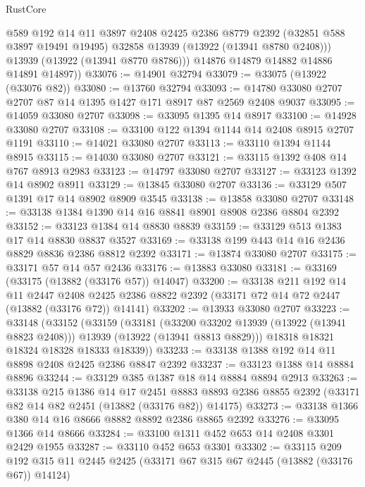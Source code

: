 \begin{lexlean}{RustCore}
\begin{coremodule}
            @589
            @192
            @14
            @11
            @3897
            @2408
            @2425
            @2386
            @8779
            @2392
            (@32851 @588 @3897 @19491 @19495)
            @32858
            @13939
            (@13922 (@13941 @8780 @2408)))
          @13939
          (@13922 (@13941 @8770 @8786)))
        @14876
        @14879
        @14882
        @14886
        @14891
        @14897))
@33076 := @14901 @32794
@33079 := @33075 (@13922 (@33076 @82))
@33080 := @13760 @32794
@33093 := @14780 @33080 @2707 @2707 @87 @14 @1395 @1427 @171 @8917 @87 @2569 @2408 @9037
@33095 := @14059 @33080 @2707
@33098 := @33095 @1395 @14 @8917
@33100 := @14928 @33080 @2707
@33108 := @33100 @122 @1394 @1144 @14 @2408 @8915 @2707 @1191
@33110 := @14021 @33080 @2707
@33113 := @33110 @1394 @1144 @8915
@33115 := @14030 @33080 @2707
@33121 := @33115 @1392 @408 @14 @767 @8913 @2983
@33123 := @14797 @33080 @2707
@33127 := @33123 @1392 @14 @8902 @8911
@33129 := @13845 @33080 @2707
@33136 := @33129 @507 @1391 @17 @14 @8902 @8909 @3545
@33138 := @13858 @33080 @2707
@33148 := @33138 @1384 @1390 @14 @16 @8841 @8901 @8908 @2386 @8804 @2392
@33152 := @33123 @1384 @14 @8830 @8839
@33159 := @33129 @513 @1383 @17 @14 @8830 @8837 @3527
@33169 := @33138 @199 @443 @14 @16 @2436 @8829 @8836 @2386 @8812 @2392
@33171 := @13874 @33080 @2707
@33175 := @33171 @57 @14 @57 @2436
@33176 := @13883 @33080
@33181 := @33169 (@33175 (@13882 (@33176 @57)) @14047)
@33200 := @33138
    @211
    @192
    @14
    @11
    @2447
    @2408
    @2425
    @2386
    @8822
    @2392
    (@33171 @72 @14 @72 @2447 (@13882 (@33176 @72)) @14141)
@33202 := @13933 @33080 @2707
@33223 := @33148
    (@33152
      (@33159
        (@33181
          (@33200 @33202 @13939 (@13922 (@13941 @8823 @2408)))
          @13939
          (@13922 (@13941 @8813 @8829)))
        @18318
        @18321
        @18324
        @18328
        @18333
        @18339))
@33233 := @33138 @1388 @192 @14 @11 @8898 @2408 @2425 @2386 @8847 @2392
@33237 := @33123 @1388 @14 @8884 @8896
@33244 := @33129 @385 @1387 @18 @14 @8884 @8894 @2913
@33263 := @33138
    @215
    @1386
    @14
    @17
    @2451
    @8883
    @8893
    @2386
    @8855
    @2392
    (@33171 @82 @14 @82 @2451 (@13882 (@33176 @82)) @14175)
@33273 := @33138 @1366 @380 @14 @16 @8666 @8882 @8892 @2386 @8865 @2392
@33276 := @33095 @1366 @14 @8666
@33284 := @33100 @1311 @452 @653 @14 @2408 @3301 @2429 @1955
@33287 := @33110 @452 @653 @3301
@33302 := @33115
    @209
    @192
    @315
    @11
    @2445
    @2425
    (@33171 @67 @315 @67 @2445 (@13882 (@33176 @67)) @14124)

\end{coremodule}
\end{lexlean}
